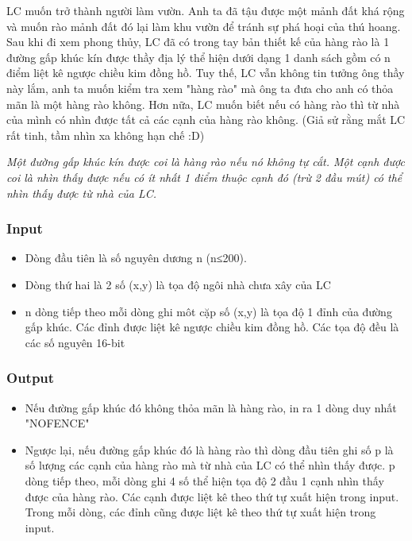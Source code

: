 



   LC muốn trở thành người làm vườn. Anh ta đã tậu được một mảnh đất khá rộng và muốn rào mảnh đất đó lại làm khu vườn để tránh sự phá hoại của thú hoang. Sau khi đi xem phong thủy, LC đã có trong tay bản thiết kế của hàng rào là 1 đường gấp khúc kín được thầy địa lý thể hiện dưới dạng 1 danh sách gồm có n điểm liệt kê ngược chiều kim đồng hồ. Tuy thế, LC vẫn không tin tưởng ông thầy này lắm, anh ta muốn kiểm tra xem "hàng rào" mà ông ta đưa cho anh có thỏa mãn là một hàng rào không. Hơn nữa, LC muốn biết nếu có hàng rào thì từ nhà của mình có nhìn được tất cả các cạnh của hàng rào không. (Giả sử rằng mắt LC rất tinh, tầm nhìn xa không hạn chế :D)  

\emph{    Một đường gấp khúc kín được coi là hàng rào nếu nó không tự cắt. Một cạnh được coi là nhìn thấy được nếu có ít nhất 1 điểm thuộc cạnh đó (trừ 2 đầu mút) có thể nhìn thấy được từ nhà của LC.   }

\subsubsection{   Input  }
\begin{itemize}
	\item     Dòng đầu tiên là số nguyên dương n (n≤200).   
	\item     Dòng thứ hai là 2 số (x,y) là tọa độ ngôi nhà chưa xây của LC   
	\item     n dòng tiếp theo mỗi dòng ghi môt cặp số (x,y) là tọa độ 1 đỉnh của đường gấp khúc. Các đỉnh được liệt kê ngược chiều kim đồng hồ. Các tọa độ đều là các số nguyên 16-bit   
\end{itemize}

\subsubsection{   Output  }
\begin{itemize}
	\item     Nếu đường gấp khúc đó không thỏa mãn là hàng rào, in ra 1 dòng duy nhất "NOFENCE"   
	\item     Ngược lại, nếu đường gấp khúc đó là hàng rào thì dòng đầu tiên ghi số p là số lượng các cạnh của hàng rào mà từ nhà của LC có thể nhìn thấy được. p dòng tiếp theo, mỗi dòng ghi 4 số thể hiện tọa độ 2 đầu 1 cạnh nhìn thấy được của hàng rào. Các cạnh được liệt kê theo thứ tự xuất hiện trong input. Trong mỗi dòng, các đỉnh cũng được liệt kê theo thứ tự xuất hiện trong input.   
\end{itemize}

